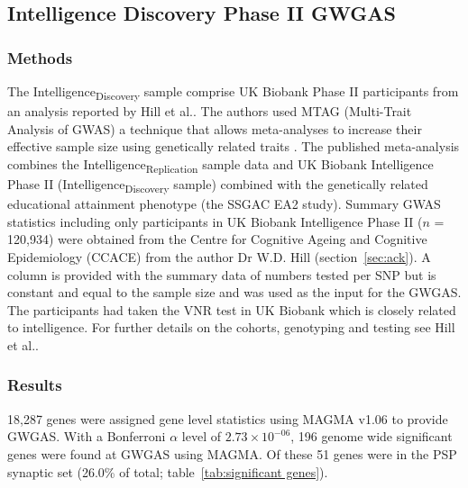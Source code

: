 





\subsection{Intelligence Discovery Phase II GWGAS}

\subsubsection{Methods}
The Intelligence\textsubscript{Discovery} sample comprise UK Biobank Phase II participants from an analysis reported by Hill et al.\cite{hill2019combined}. The authors used MTAG (Multi-Trait Analysis of GWAS) a technique that allows meta-analyses to increase their effective sample size using genetically related traits \cite{turley2018multi}. The published meta-analysis\cite{hill2019combined} combines the Intelligence\textsubscript{Replication} sample data \cite{sniekers2017genome} and UK Biobank Intelligence Phase II (Intelligence\textsubscript{Discovery} sample) combined with the genetically related educational attainment phenotype (the SSGAC EA2 study)\cite{okbay2016genome}. Summary GWAS statistics including only participants in UK Biobank Intelligence Phase II ($n$ = 120,934) were obtained from the Centre for Cognitive Ageing and Cognitive Epidemiology (CCACE) from the author Dr W.D. Hill (section~\ref{sec:ack}).  A column is provided with the summary data of numbers tested per SNP but is constant and equal to the sample size and was used as the input for the GWGAS. The participants had taken the VNR test in UK Biobank which is closely related to intelligence\cite{hill2019combined}. For further details on the cohorts, genotyping and testing see Hill et al.\cite{hill2019combined}.


\subsubsection{Results}
18,287 genes were assigned gene level statistics using MAGMA v1.06 to provide GWGAS.  With a Bonferroni $\alpha$ level of  $
2.73\times 10^{-06}$, 196 genome wide significant genes were found at GWGAS using MAGMA. Of these 51 genes were in the PSP synaptic set (26.0\% of total; table~\ref{tab:significant genes}).








